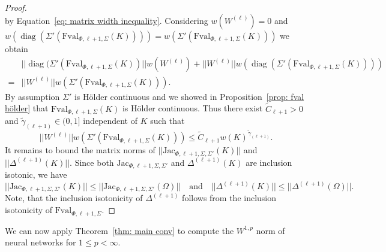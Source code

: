 \documentclass[a4paper, 11pt]{article}
\begin{document}
\begin{proof}
$$		$$
		by Equation~\eqref{eq: matrix width inequality}. Considering $w(W^{(\ell)})=0$ and $w(\operatorname{diag}(\Sigma'(\mathrm{Fval}_{\Phi , {\ell}+1, \Sigma}({K})))) =w(\Sigma'(\mathrm{Fval}_{\Phi , {\ell}+1, \Sigma}({K})))$ we obtain
		\begin{align*}
			&||\operatorname{diag}(\Sigma'(\mathrm{Fval}_{\Phi , {\ell}+1, \Sigma}({K}))|| w(W^{(\ell)}) + ||W^{(\ell)}||w(\operatorname{diag}(\Sigma'(\mathrm{Fval}_{\Phi , {\ell}+1, \Sigma}({K})))) \\
			= &||W^{(\ell)}||w(\Sigma'(\mathrm{Fval}_{\Phi , {\ell}+1, \Sigma}({K}))).
		\end{align*}
		By assumption $\Sigma'$ is Hölder continuous and we showed in Proposition~\ref{prop: fval hölder} that $\mathrm{Fval}_{\Phi , {\ell}+1, \Sigma}({K})$ is Hölder continuous. Thus there exist $\tilde{C}_{\ell +1} > 0$ and $\tilde{\gamma}_{(\ell+1)} \in (0,1]$ independent of $K$ such that
		$$ ||W^{(\ell)}||w(\Sigma'(\mathrm{Fval}_{\Phi , {\ell}+1, \Sigma}({K}))) \leq \tilde{C}_{\ell +1}w(K)^{\tilde{\gamma}_{(\ell+1)}}. $$
		It remains to bound the matrix norms of $||\mathrm{Jac}_{\Phi,{\ell}+1, \Sigma, \Sigma'}({K})||$ and $||\Delta^{(\ell+1)}(K)||$. Since both $\mathrm{Jac}_{\Phi,{\ell}+1, \Sigma, \Sigma'}$ and $\Delta^{(\ell+1)}(K)$ are inclusion isotonic, we have
		$$||\mathrm{Jac}_{\Phi,{\ell}+1, \Sigma, \Sigma'}({K})|| \leq ||\mathrm{Jac}_{\Phi,{\ell}+1, \Sigma, \Sigma'}({\Omega})|| \quad \text{and} \quad ||\Delta^{(\ell+1)}(K)|| \leq ||\Delta^{(\ell+1)}(\Omega)||.$$
		Note, that the inclusion isotonicity of $\Delta^{(\ell+1)}$ follows from the inclusion isotonicity of $\mathrm{Fval}_{\Phi, \ell+1, \Sigma}$.
	\end{proof}
	
	
	We can now apply Theorem~\ref{thm: main conv} to compute the $W^{1,p}$ norm of neural networks for $1\leq p < \infty$.
	
\end{document}
